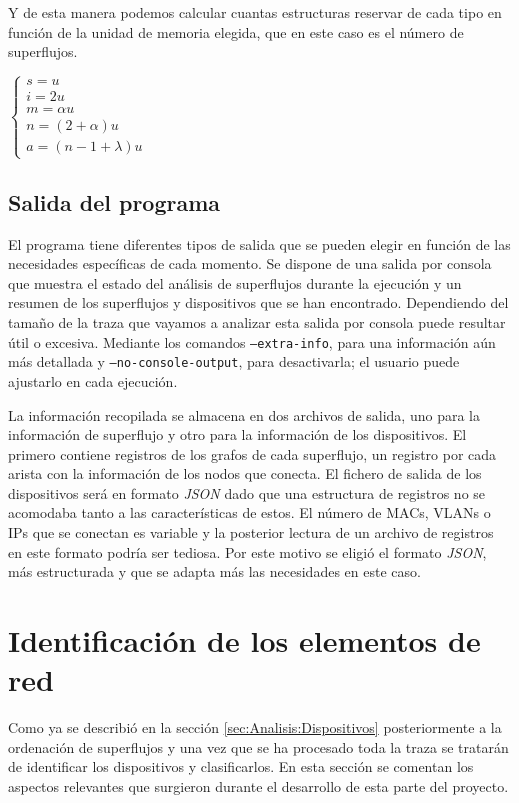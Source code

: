 \documentclass[twoside, 12pt]{epstfg}
\begin{document}
Y de esta manera podemos calcular cuantas estructuras reservar de cada tipo en función de la unidad de memoria elegida, que en este caso es el número de superflujos.

$\begin{cases}
	s = u\\ 
	i = 2u\\ 
	m = \alpha u\\
	n = (2+\alpha)u\\
	a = (n - 1 + \lambda) u
\end{cases}$

\subsection{Salida del programa}
El programa tiene diferentes tipos de salida que se pueden elegir en función de las necesidades específicas de cada momento. Se dispone de una salida por consola que muestra el estado del análisis de superflujos durante la ejecución y un resumen de los superflujos y dispositivos que se han encontrado. Dependiendo del tamaño de la traza que vayamos a analizar esta salida por consola puede resultar útil o excesiva. Mediante los comandos \texttt{--extra-info}, para una información aún más detallada y \texttt{--no-console-output}, para desactivarla; el usuario puede ajustarlo en cada ejecución.

La información recopilada se almacena en dos archivos de salida, uno para la información de superflujo y otro para la información de los dispositivos. El primero contiene registros de los grafos de cada superflujo, un registro por cada arista con la información de los nodos que conecta. El fichero de salida de los dispositivos será en formato \textit{JSON} dado que una estructura de registros no se acomodaba tanto a las características de estos. El número de MACs, VLANs o IPs que se conectan es variable y la posterior lectura de un archivo de registros en este formato podría ser tediosa. Por este motivo se eligió el formato \textit{JSON}, más estructurada y que se adapta más las necesidades en este caso.

\section{Identificación de los elementos de red}
Como ya se describió en la sección \ref{sec:Analisis:Dispositivos} posteriormente a la ordenación de superflujos y una vez que se ha procesado toda la traza se tratarán de identificar los dispositivos y clasificarlos. En esta sección se comentan los aspectos relevantes que surgieron durante el desarrollo de esta parte del proyecto.
\end{document}
